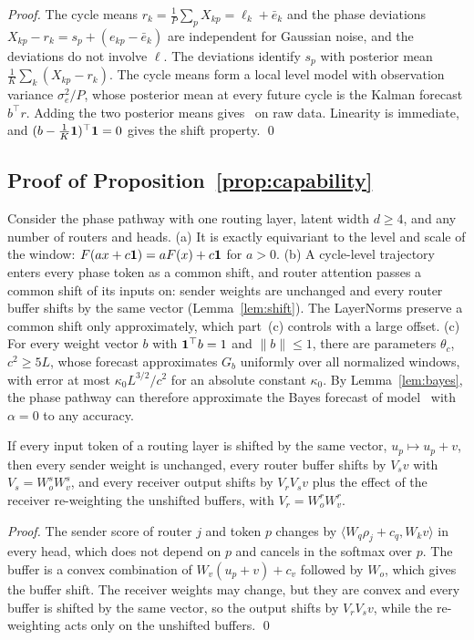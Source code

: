 {\begin{proof}
The cycle means $r_k=\tfrac1P\sum_pX_{kp}=\ell_k+\bar e_k$ and the phase deviations $X_{kp}-r_k=s_p+(e_{kp}-\bar e_k)$ are independent for Gaussian noise, and the deviations do not involve $\ell$. The deviations identify $s_p$ with posterior mean $\tfrac1K\sum_k(X_{kp}-r_k)$. The cycle means form a local level model with observation variance $\sigma_e^2/P$, whose posterior mean at every future cycle is the Kalman forecast $b^\top r$. Adding the two posterior means gives~ on raw data. Linearity is immediate, and $(b-\tfrac1K\mathbf 1)^\top\mathbf 1=0$ gives the shift property. \qed
\end{proof}

\subsection{Proof of Proposition~\ref{prop:capability}}

 Consider the phase pathway with one routing layer, latent width $d\ge4$, and any number of routers and heads.
(a) It is exactly equivariant to the level and scale of the window: $F(ax+c\mathbf 1)=aF(x)+c\mathbf 1$ for $a>0$.
(b) A cycle-level trajectory enters every phase token as a common shift, and router attention passes a common shift of its inputs on: sender weights are unchanged and every router buffer shifts by the same vector (Lemma~\ref{lem:shift}). The LayerNorms preserve a common shift only approximately, which part~(c) controls with a large offset.
(c) For every weight vector $b$ with $\mathbf 1^\top b=1$ and $\|b\|\le1$, there are parameters $\theta_c$, $c^2\ge5L$, whose forecast approximates $G_b$ uniformly over all normalized windows, with error at most $\kappa_0L^{3/2}/c^2$ for an absolute constant $\kappa_0$. By Lemma~\ref{lem:bayes}, the phase pathway can therefore approximate the Bayes forecast of model~ with $\alpha=0$ to any accuracy.

\begin{lemma}
\label{lem:shift}
If every input token of a routing layer is shifted by the same vector, $u_p\mapsto u_p+v$, then every sender weight is unchanged, every router buffer shifts by $V_sv$ with $V_s=W^s_oW^s_v$, and every receiver output shifts by $V_rV_sv$ plus the effect of the receiver re-weighting the unshifted buffers, with $V_r=W^r_oW^r_v$.
\end{lemma}

\begin{proof}
The sender score of router $j$ and token $p$ changes by $\langle W_q\rho_j+c_q,W_kv\rangle$ in every head, which does not depend on $p$ and cancels in the softmax over $p$. The buffer is a convex combination of $W_v(u_p+v)+c_v$ followed by $W_o$, which gives the buffer shift. The receiver weights may change, but they are convex and every buffer is shifted by the same vector, so the output shifts by $V_rV_sv$, while the re-weighting acts only on the unshifted buffers. \qed
\end{proof}

}

